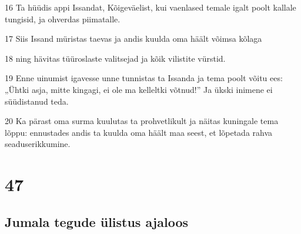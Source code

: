 \par 16 Ta hüüdis appi Issandat, Kõigeväelist, kui vaenlased temale igalt poolt kallale tungisid, ja ohverdas piimatalle.
\par 17 Siis Issand müristas taevas ja andis kuulda oma häält võimsa kõlaga
\par 18 ning hävitas tüüroslaste valitsejad ja kõik vilistite vürstid.
\par 19 Enne uinumist igavesse unne tunnistas ta Issanda ja tema poolt võitu ees: „Ühtki asja, mitte kingagi, ei ole ma kelleltki võtnud!” Ja ükski inimene ei süüdistanud teda.
\par 20 Ka pärast oma surma kuulutas ta prohvetlikult ja näitas kuningale tema lõppu: ennustades andis ta kuulda oma häält maa seest, et lõpetada rahva seaduserikkumine.

\chapter{47}

\section*{Jumala tegude ülistus ajaloos}

